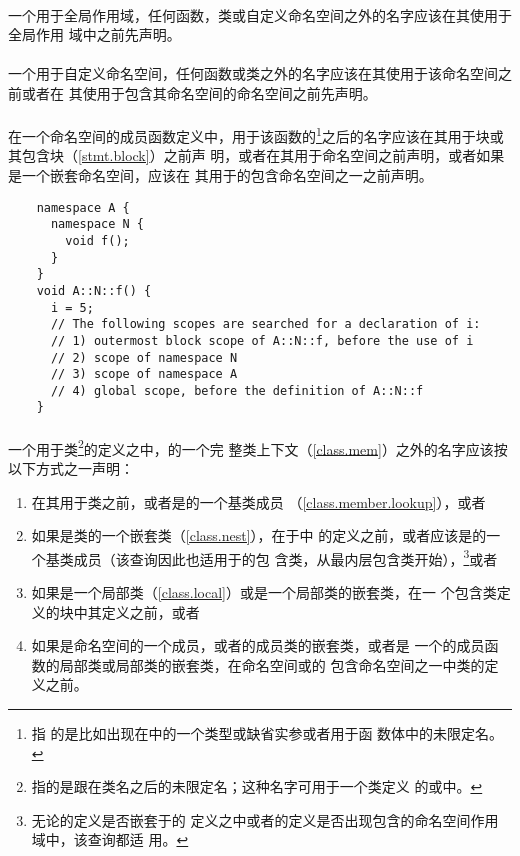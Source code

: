 \paragraph{} %
一个用于全局作用域，任何函数，类或自定义命名空间之外的名字应该在其使用于全局作用
域中之前先声明。

\paragraph{} %
一个用于自定义命名空间，任何函数或类之外的名字应该在其使用于该命名空间之前或者在
其使用于包含其命名空间的命名空间之前先声明。

\paragraph{} %
在一个命名空间的成员函数定义中，用于该函数的\footnote{指
的是比如出现在中的一个类型或缺省实参或者用于函
数体中的未限定名。}之后的名字应该在其用于块或其包含块（\ref{stmt.block}）之前声
明，或者在其用于命名空间之前声明，或者如果是一个嵌套命名空间，应该在
其用于的包含命名空间之一之前声明。

\begin{example}
  \begin{lstlisting}
    namespace A {
      namespace N {
        void f();
      }
    }
    void A::N::f() {
      i = 5;
      // The following scopes are searched for a declaration of i:
      // 1) outermost block scope of A::N::f, before the use of i
      // 2) scope of namespace N
      // 3) scope of namespace A
      // 4) global scope, before the definition of A::N::f
    }
  \end{lstlisting}
\end{example}

\paragraph{} %
一个用于类\footnote{指的是跟在类名之后的未限定名；这种名字可用于一个类定义
的或中。}的定义之中，的一个完
整类上下文（\ref{class.mem}）之外的名字应该按以下方式之一声明：
\begin{enumerate}
  \item 在其用于类之前，或者是的一个基类成员
        （\ref{class.member.lookup}），或者
  \item 如果是类的一个嵌套类（\ref{class.nest}），在于中
        的定义之前，或者应该是的一个基类成员（该查询因此也适用于的包
        含类，从最内层包含类开始），\footnote{无论的定义是否嵌套于的
        定义之中或者的定义是否出现包含的命名空间作用域中，该查询都适
        用。}或者
  \item 如果是一个局部类（\ref{class.local}）或是一个局部类的嵌套类，在一
        个包含类定义的块中其定义之前，或者
  \item 如果是命名空间的一个成员，或者的成员类的嵌套类，或者是
        一个的成员函数的局部类或局部类的嵌套类，在命名空间或的
        包含命名空间之一中类的定义之前。
\end{enumerate}

